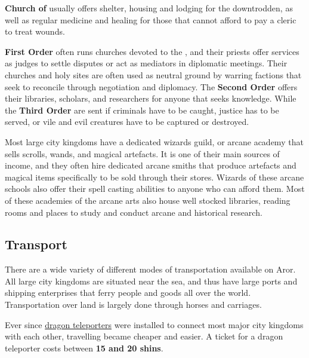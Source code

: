 \textbf{Church of } usually offers shelter, housing and
lodging for the downtrodden, as well as regular medicine and healing for those
that cannot afford to pay a cleric to treat wounds.

\textbf{First Order} often runs churches devoted to the ,
and their priests offer services as judges to settle disputes or act as
mediators in diplomatic meetings. Their churches and holy sites are often
used as neutral ground by warring factions that seek to reconcile through
negotiation and diplomacy. The \textbf{Second Order} offers their libraries,
scholars, and researchers for anyone that seeks knowledge. While the
\textbf{Third Order} are sent if criminals have to be caught, justice has to
be served, or vile and evil creatures have to be captured or destroyed.

Most large city kingdoms have a dedicated wizards guild, or arcane academy
that sells scrolls, wands, and magical artefacts. It is one of their main
sources of income, and they often hire dedicated arcane smiths that produce
artefacts and magical items specifically to be sold through their stores.
Wizards of these arcane schools also offer their spell casting abilities to
anyone who can afford them. Most of these academies of the arcane arts also
house well stocked libraries, reading rooms and places to study and conduct
arcane and historical research.

\subsection{Transport}
\label{sec:Transport}

There are a wide variety of different modes of transportation available on
Aror. All large city kingdoms are situated near the sea, and thus have large
ports and shipping enterprises that ferry people and goods all over the
world. Transportation over land is largely done through horses and carriages.

Ever since \hyperref[sec:Dragon Teleporter]{dragon teleporters} were installed
to connect most major city kingdoms with each other, travelling became cheaper
and easier. A ticket for a dragon teleporter costs between \textbf{15 and 20
  shins}.
